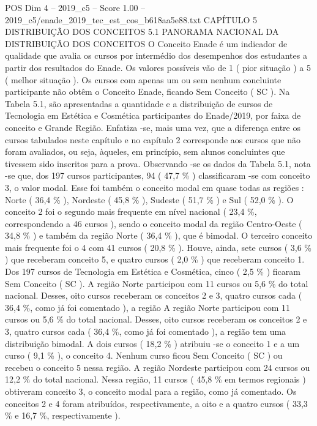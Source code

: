 \begin{textsample}{POS Dim 4 – 2019\_c5 – Score 1.00 – 2019\_c5/enade\_2019\_tec\_est\_cos\_b618aa5e88.txt}  \label{ex:f4_pos_194}
CAPÍTULO 5 DISTRIBUIÇÃO DOS CONCEITOS 5.1 PANORAMA NACIONAL DA DISTRIBUIÇÃO DOS CONCEITOS O Conceito Enade é um indicador de qualidade que avalia os cursos por intermédio dos desempenhos dos estudantes a partir dos resultados do Enade.
Os valores possíveis vão de 1 ( pior situação ) a 5 ( melhor situação ).
Os cursos com apenas um ou sem nenhum concluinte participante não obtêm o Conceito Enade, ficando Sem Conceito ( SC ).
Na Tabela 5.1, são apresentadas a quantidade e a distribuição de cursos de Tecnologia em Estética e Cosmética participantes do Enade/2019, por faixa de conceito e Grande Região.
Enfatiza -se, mais uma vez, que a diferença entre os cursos tabulados neste capítulo e no capítulo 2 corresponde aos cursos que não foram avaliados, ou seja, àqueles, em princípio, sem alunos concluintes que tivessem sido inscritos para a prova.
Observando -se os dados da Tabela 5.1, nota -se que, dos 197 cursos participantes, 94 ( 47,7 \% ) classificaram -se com conceito 3, o valor modal.
Esse foi também o conceito modal em quase todas as regiões : Norte ( 36,4 \% ), Nordeste ( 45,8 \% ), Sudeste ( 51,7 \% ) e Sul ( 52,0 \% ).
O conceito 2 foi o segundo mais frequente em nível nacional ( 23,4 \%, correspondendo a 46 cursos ), sendo o conceito modal da região Centro-Oeste ( 34,8 \% ) e também da região Norte ( 36,4 \% ), que é bimodal.
O terceiro conceito mais frequente foi o 4 com 41 cursos ( 20,8 \% ).
Houve, ainda, sete cursos ( 3,6 \% ) que receberam conceito 5, e quatro cursos ( 2,0 \% ) que receberam conceito 1.
Dos 197 cursos de Tecnologia em Estética e Cosmética, cinco ( 2,5 \% ) ficaram Sem Conceito ( SC ).
A região Norte participou com 11 cursos ou 5,6 \% do total nacional.
Desses, oito cursos receberam os conceitos 2 e 3, quatro cursos cada ( 36,4 \%, como já foi comentado ), a região A região Norte participou com 11 cursos ou 5,6 \% do total nacional.
Desses, oito cursos receberam os conceitos 2 e 3, quatro cursos cada ( 36,4 \%, como já foi comentado ), a região tem uma distribuição bimodal.
A dois cursos ( 18,2 \% ) atribuiu -se o conceito 1 e a um curso ( 9,1 \% ), o conceito 4.
Nenhum curso ficou Sem Conceito ( SC ) ou recebeu o conceito 5 nessa região.
A região Nordeste participou com 24 cursos ou 12,2 \% do total nacional.
Nessa região, 11 cursos ( 45,8 \% em termos regionais ) obtiveram conceito 3, o conceito modal para a região, como já comentado.
Os conceitos 2 e 4 foram atribuídos, respectivamente, a oito e a quatro cursos ( 33,3 \% e 16,7 \%, respectivamente ).

\end{textsample}
